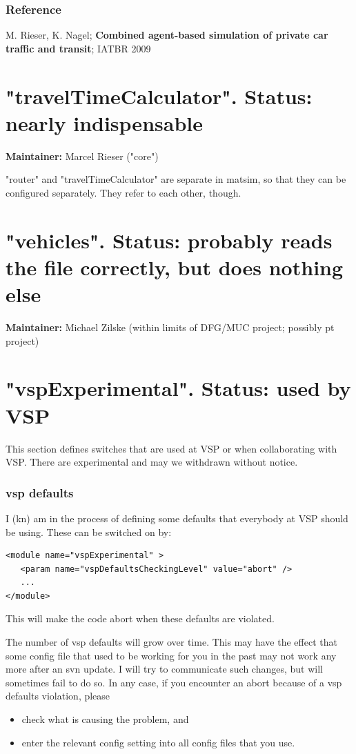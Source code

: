 \subsubsection{Reference}

M. Rieser, K. Nagel; \textbf{Combined agent-based simulation of private car traffic and transit}; IATBR 2009

\vfill\eject
\section{"travelTimeCalculator". Status: nearly indispensable}

\textbf{Maintainer:} Marcel Rieser ("core")

"router" and "travelTimeCalculator" are separate in matsim, so that  they can be configured separately. They refer to each other,  though.

\vfill\eject
\section{"vehicles". Status: probably reads the file correctly, but does nothing else}

\textbf{Maintainer:} Michael Zilske (within limits of DFG/MUC project; possibly pt project)

\vfill\eject
\section{"vspExperimental". Status: used by VSP}

This  section defines switches that are used at VSP or when collaborating  with VSP. There are experimental and may we withdrawn without  notice.

\subsubsection{vsp defaults}

I (kn) am in the process of defining some defaults that everybody at VSP should be using. These can be switched on by:
\begin{verbatim}
<module name="vspExperimental" >
   <param name="vspDefaultsCheckingLevel" value="abort" />
   ...
</module>

\end{verbatim}

This will make the code abort when these defaults are violated.

The number of vsp defaults will grow over time. This may have  the effect that some config file that used to be working for you in the  past may not work any more after an svn update. I will try to  communicate such changes, but will sometimes fail to do so. In any  case, if you encounter an abort because of a vsp defaults violation,  please
\begin{itemize}
	\item check what is causing the problem, and
	\item enter the relevant config setting into all config files that you use.
\end{itemize}


